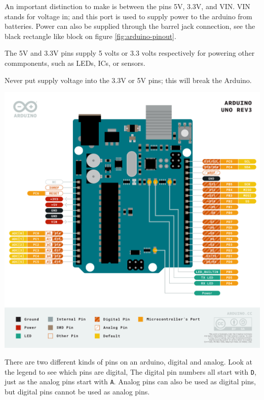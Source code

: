 \documentclass[a4paper,12pt]{article}
\begin{document}
An important distinction to make is between the pins 5V, 3.3V, and VIN. VIN stands for voltage in; and this port is used to supply power to the arduino from batteries. Power can also be supplied through the barrel jack connection, see the black rectangle like block on figure \ref{fig:arduino-pinout}. 

The 5V and 3.3V  pins supply 5 volts or 3.3 volts respectively for powering other commponents, such as LEDs, ICs, or sensors.  \\

\begin{warningbox}
    Never put supply voltage into the 3.3V or 5V pins; this will break the Arduino. 
\end{warningbox}


\begin{center}
    \includegraphics[width=\linewidth]{Pinout-UNOrev3_latest.png}
    \label{fig:arduino-pinout}
\end{center}


There are two different kinds of pins on an arduino, digital and analog. Look at the legend to see which pins are digital, The digital pin numbers all start with \lstinline[]!D!, just as the analog pins start with \lstinline[]!A!.
Analog pins can also be used as digital pins, but digital pins cannot be used as analog pins. \\
\end{document}
